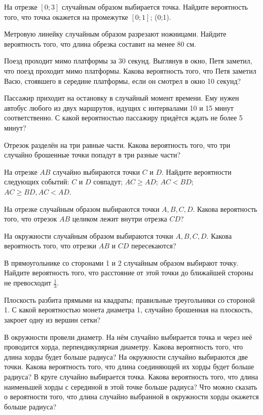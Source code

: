 \documentclass[a4paper,12pt]{article}
\begin{document}

  На отрезке $[0;3]$ случайным образом выбирается точка. Найдите вероятность того, что точка окажется на промежутке  $[0;1]$;  (0;1).

  Метровую линейку случайным образом разрезают ножницами. Найдите вероятность того, что длина обрезка составит на менее 80 см.

  Поезд проходит мимо платформы за 30 секунд. Выглянув в окно, Петя заметил, что поезд проходит мимо платформы. Какова вероятность того, что Петя заметил Васю, стоявшего в середине платформы, если он смотрел в окно 10 секунд?

  Пассажир приходит на остановку в случайный момент времени. Ему нужен автобус любого из двух маршрутов, идущих с интервалами 10 и 15 минут соответственно. С какой вероятностью пассажиру придётся ждать не более 5 минут?

  Отрезок разделён на три равные части. Какова вероятность того, что три случайно брошенные точки попадут в три разные части?

  На отрезке $AB$ случайно выбираются точки $C$ и $D$. Найдите вероятности следующих событий:  $C$ и $D$ совпадут;  $AC\ge AD$;  $AC<BD$;  $AC\ge BD, AC<AD$.

  На отрезке случайным образом выбираются точки $A, B, C, D$. Какова вероятность того, что отрезок $AB$ целиком лежит внутри отрезка $CD$?

  На окружности случайным образом выбираются точки $A, B, C, D$. Какова вероятность того, что отрезки $AB$ и $CD$ пересекаются?

  В прямоугольнике со сторонами 1 и 2 случайным образом выбирают точку. Найдите вероятность того, что расстояние от этой точки до ближайшей стороны не превосходит $\frac{1}{3}$.

  Плоскость разбита прямыми на  квадраты;  правильные треугольники со стороной 1. С какой вероятностью монета диаметра 1, случайно брошенная на плоскость, закроет одну из вершин сетки?

   В окружности провели диаметр. На нём случайно выбирается точка и через неё проводится хорда, перпендикулярная диаметру. Какова вероятность того, что длина хорды будет больше радиуса?  На окружности случайно выбираются две точки. Какова вероятность того, что длина соединяющей их хорды будет больше радиуса?  В круге случайно выбирается точка. Какова вероятность того, что длина наименьшей хорды с серединой в этой точке больше радиуса?  Что можно сказать о вероятности того, что длина случайно выбранной в окружности хорды окажется больше радиуса?
\end{document}
